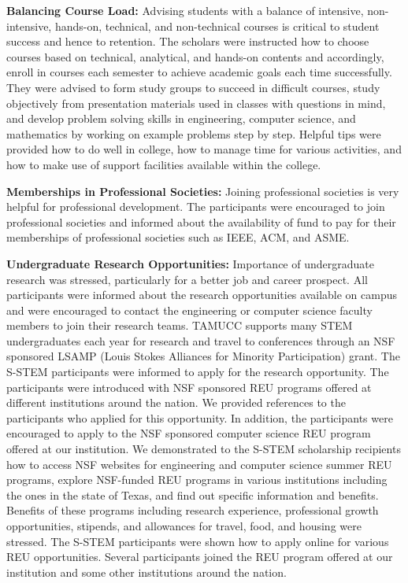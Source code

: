 \documentclass{article}
\begin{document}
\textbf{Balancing Course Load:} Advising students with a balance of intensive, non-intensive, hands-on, technical, and non-technical courses is critical to student success and hence to retention. The scholars were instructed how to choose courses based on technical, analytical, and hands-on contents and accordingly, enroll in courses each semester to achieve academic goals each time successfully. They were advised to form study groups to succeed in difficult courses, study objectively from presentation materials used in classes with questions in mind, and develop problem solving skills in engineering, computer science, and mathematics by working on example problems step by step. Helpful tips were provided how to do well in college, how to manage time for various activities, and how to make use of support facilities available within the college.

\textbf{Memberships in Professional Societies:} Joining professional societies is very helpful for professional development. The participants were encouraged to join professional societies and informed about the availability of fund to pay for their memberships of professional societies such as IEEE, ACM, and ASME.

\textbf{Undergraduate Research Opportunities:} Importance of undergraduate research was stressed, particularly for a better job and career prospect. All participants were informed about the research opportunities available on campus and were encouraged to contact the engineering or computer science faculty members to join their research teams. TAMUCC supports many STEM undergraduates each year for research and travel to conferences through an NSF sponsored LSAMP (Louis Stokes Alliances for Minority Participation) grant. The S-STEM participants were informed to apply for the research opportunity. The participants were introduced with NSF sponsored REU programs offered at different institutions around the nation. We provided references to the participants who applied for this opportunity. In addition, the participants were encouraged to apply to the NSF sponsored computer science REU program offered at our institution. We demonstrated to the S-STEM scholarship recipients how to access NSF websites for engineering and computer science summer REU programs, explore NSF-funded REU programs in various institutions including the ones in the state of Texas, and find out specific information and benefits. Benefits of these programs including research experience, professional growth opportunities, stipends, and allowances for travel, food, and housing were stressed. The S-STEM participants were shown how to apply online for various REU opportunities.  Several participants joined the REU program offered at our institution and some other institutions around the nation. 
\end{document}
